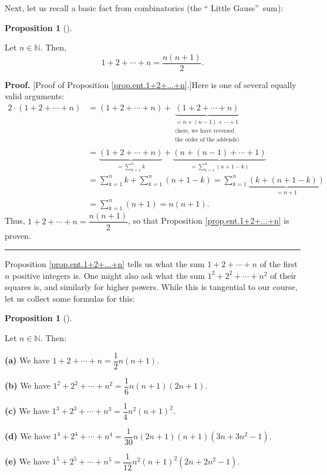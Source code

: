 \documentclass[numbers=enddot,12pt,final,onecolumn,notitlepage]{scrartcl}%
\numberwithin{exer}{subsection}
\theoremstyle{definition}
\newtheorem{prop}[theo]{Proposition}
\newenvironment{proposition}[1][]
{\begin{prop}[#1]\begin{leftbar}}
{\end{leftbar}\end{prop}}
\newenvironment{proof}[1][Proof]{\noindent\textbf{#1.} }{\ \rule{0.5em}{0.5em}}
\let\sumnonlimits\sum
\renewcommand{\sum}{\sumnonlimits\limits}
\begin{document}
Next, let us recall a basic fact from combinatorics (the \textquotedblleft
Little Gauss\textquotedblright\ sum):

\begin{proposition}
\label{prop.ent.1+2+...+n}Let $n\in\mathbb{N}$. Then,
\[
1+2+\cdots+n=\dfrac{n\left(  n+1\right)  }{2}.
\]

\end{proposition}

\begin{proof}
[Proof of Proposition \ref{prop.ent.1+2+...+n}.]Here is one of several equally
valid arguments:%
\begin{align*}
2\cdot\left(  1+2+\cdots+n\right)   &  =\left(  1+2+\cdots+n\right)
+\underbrace{\left(  1+2+\cdots+n\right)  }_{\substack{=n+\left(  n-1\right)
+\cdots+1\\\text{(here, we have reversed}\\\text{the order of the addends)}%
}}\\
&  =\underbrace{\left(  1+2+\cdots+n\right)  }_{=\sum_{k=1}^{n}k}%
+\underbrace{\left(  n+\left(  n-1\right)  +\cdots+1\right)  }_{=\sum
_{k=1}^{n}\left(  n+1-k\right)  }\\
&  =\sum_{k=1}^{n}k+\sum_{k=1}^{n}\left(  n+1-k\right)  =\sum_{k=1}%
^{n}\underbrace{\left(  k+\left(  n+1-k\right)  \right)  }_{=n+1}\\
&  =\sum_{k=1}^{n}\left(  n+1\right)  =n\left(  n+1\right)  .
\end{align*}
Thus, $1+2+\cdots+n=\dfrac{n\left(  n+1\right)  }{2}$, so that Proposition
\ref{prop.ent.1+2+...+n} is proven.
\end{proof}

Proposition \ref{prop.ent.1+2+...+n} tells us what the sum $1+2+\cdots+n$ of
the first $n$ positive integers is. One might also ask what the sum
$1^{2}+2^{2}+\cdots+n^{2}$ of their squares is, and similarly for higher
powers. While this is tangential to our course, let us collect some formulas
for this:

\begin{proposition}
\label{prop.ent.1d+2d+...+nd-for-5}Let $n\in\mathbb{N}$. Then:

\textbf{(a)} We have $1+2+\cdots+n=\dfrac{1}{2}n\left(  n+1\right)  $.

\textbf{(b)} We have $1^{2}+2^{2}+\cdots+n^{2}=\dfrac{1}{6}n\left(
n+1\right)  \left(  2n+1\right)  $.

\textbf{(c)} We have $1^{3}+2^{3}+\cdots+n^{3}=\dfrac{1}{4}n^{2}\left(
n+1\right)  ^{2}$.

\textbf{(d)} We have $1^{4}+2^{4}+\cdots+n^{4}=\dfrac{1}{30}n\left(
2n+1\right)  \left(  n+1\right)  \left(  3n+3n^{2}-1\right)  $.

\textbf{(e)} We have $1^{5}+2^{5}+\cdots+n^{5}=\dfrac{1}{12}n^{2}\left(
n+1\right)  ^{2}\left(  2n+2n^{2}-1\right)  $.
\end{proposition}
\end{document}
